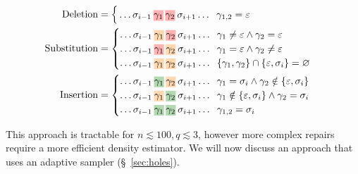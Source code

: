 \documentclass[sigplan,review,anonymous,acmsmall]{acmart}\settopmatter{printfolios=false,printccs=false,printacmref=false}
\begin{document}
\begin{align*}
    \text{Deletion}&=\begin{cases}
                         \,\ldots\sigma_{i-1}\:\text{\hlred{$\gamma_1$}\:\hlred{$\gamma_2$}}\:\sigma_{i+1}\ldots\hspace{0.2cm}\gamma_{1, 2} = \varepsilon\label{eq:del}
    \end{cases}\\
    \text{Substitution}&=\begin{cases}
                             \ldots\sigma_{i-1}\:\text{\hlorange{$\gamma_1$}\:\hlred{$\gamma_2$}}\:\sigma_{i+1}\ldots\hspace{0.2cm}\gamma_1 \neq \varepsilon \land \gamma_2 = \varepsilon\\
                             \ldots\sigma_{i-1}\:\text{\hlred{$\gamma_1$}\:\hlorange{$\gamma_2$}}\:\sigma_{i+1}\ldots\hspace{0.2cm}\gamma_1 = \varepsilon \land \gamma_2 \neq \varepsilon\\
                             \ldots\sigma_{i-1}\:\text{\hlorange{$\gamma_1$}\:\hlorange{$\gamma_2$}}\:\sigma_{i+1}\ldots\hspace{0.2cm}\{\gamma_1, \gamma_2\}\cap\{\varepsilon, \sigma_i\} = \varnothing
    \end{cases}\\
    \text{Insertion}&=\begin{cases}
                          \ldots\sigma_{i-1}\:\text{\hlgreen{$\gamma_1$}\:\hlorange{$\gamma_2$}}\:\sigma_{i+1}\ldots\hspace{0.2cm}\gamma_1 = \sigma_i \land \gamma_2 \notin \{\varepsilon,  \sigma_i\}\label{eq:ins2}\\
                          \ldots\sigma_{i-1}\:\text{\hlorange{$\gamma_1$}\:\hlgreen{$\gamma_2$}}\:\sigma_{i+1}\ldots\hspace{0.2cm}\gamma_1 \notin \{\varepsilon, \sigma_i\} \land \gamma_2 = \sigma_i\label{eq:ins1}\\
                          \ldots\sigma_{i-1}\:\text{\hlgreen{$\gamma_1$}\:\hlgreen{$\gamma_2$}}\:\sigma_{i+1}\ldots\hspace{0.2cm}\gamma_{1,2} = \sigma_i\label{eq:copy}
    \end{cases}
\end{align*}

\noindent This approach is tractable for $n \lesssim 100, q \lesssim 3$, however more complex repairs require a more efficient density estimator. We will now discuss an approach that uses an adaptive sampler (\S~\ref{sec:holes}).
\end{document}
